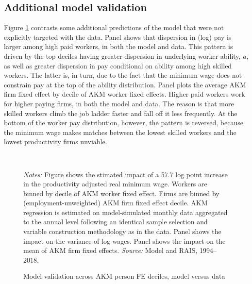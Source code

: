 \clearpage
\subsection{Additional model validation\label{app_subsec:model_validation}}

Figure \ref{figure: model validation} contrasts some additional predictions of the model that were not explicitly targeted with the data. Panel  shows that dispersion in (log) pay is larger among high paid workers, in both the model and data. This pattern is driven by the top deciles having greater dispersion in underlying worker ability, $a$, as well as greater dispersion in pay conditional on ability among high skilled workers. The latter is, in turn, due to the fact that the minimum wage does not constrain pay at the top of the ability distribution. Panel  plots the average AKM firm fixed effect by decile of AKM worker fixed effects. Higher paid workers work for higher paying firms, in both the model and data. The reason is that more skilled workers climb the job ladder faster and fall off it less frequently. At the bottom of the worker pay distribution, however, the pattern is reversed, because the minimum wage makes matches between the lowest skilled workers and the lowest productivity firms unviable.

\begin{figure}[!htb]
  \centering
  \caption{Model validation across AKM person FE deciles, model versus data \label{figure: model validation}}
  \prefigvspace
  \\
  \postfigvspace
  \begin{minipage}[t]{1\columnwidth}%
    \begin{spacing}{0.75}
      \emph{\scriptsize{}Notes: }{\scriptsize{}Figure shows the stimated impact of a 57.7 log point increase in the productivity adjusted real minimum wage. Workers are binned by decile of AKM worker fixed effect. Firms are binned by (employment-unweighted) AKM firm fixed effect decile. AKM regression is estimated on model-simulated monthly data aggregated to the annual level following an identical sample selection and variable construction methodology as in the data. Panel  shows the impact on the variance of log wages. Panel  shows the impact on the mean of AKM firm fixed effects. %
      \emph{\scriptsize{}Source: } Model and RAIS, 1994--2018.}
    \end{spacing}
  \end{minipage}
\end{figure}




